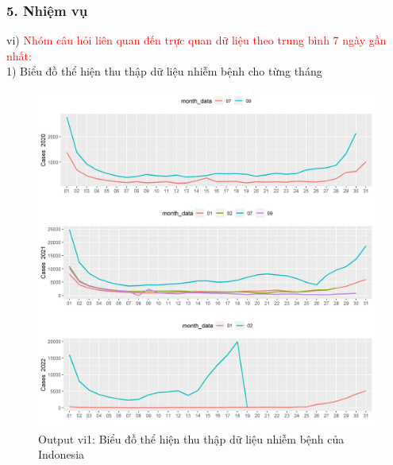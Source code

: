\documentclass[english,10pt,table]{beamer}
\begin{document}
\begin{frame}[fragile]
\frametitle{5.  Nhiệm vụ}
vi) \textcolor{red}{Nhóm câu hỏi liên quan đến trực quan dữ liệu theo trung bình 7 ngày gần nhất:}\\
    1) Biểu đồ thể hiện thu thập dữ liệu nhiễm bệnh cho từng tháng
	\begin{figure}[h!]
	\begin{center}
		    \includegraphics[scale = 0.26]{Images/VI/vi1 Indonesia .jpeg}
		     \caption{Output vi1: Biểu đồ thể hiện thu thập dữ liệu nhiễm bệnh của Indonesia}
		\end{center}
		\end{figure}
\end{frame}
\end{document}
